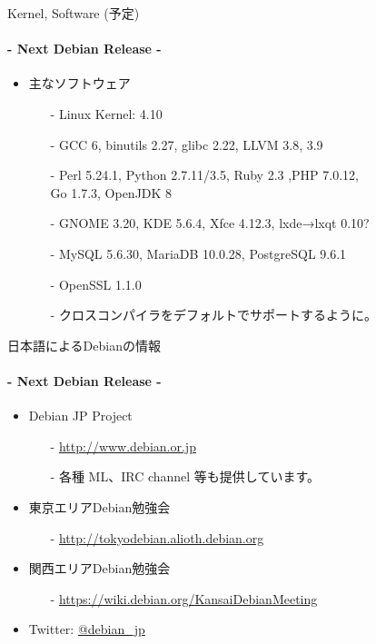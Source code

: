 \documentclass[cjk,dvipdfmx,14pt,compress,fragile]{beamer}
\begin{document}
\begin{frame}[c,fragile]{Kernel, Software (予定)}
  \framesubtitle{- Next Debian Release -}
  \pause
  \begin{itemize}[<+->]
    \item%
      主なソフトウェア
      \begin{itemize}[<+->]
      \item[-] %
        Linux Kernel: \alert{4.10}
      \item[-] %
        GCC 6, binutils 2.27, glibc 2.22, LLVM 3.8, 3.9
      \item[-] %
        Perl 5.24.1, Python 2.7.11/3.5, Ruby 2.3 ,PHP 7.0.12, \\Go 1.7.3, OpenJDK 8
      \item[-] %
        GNOME 3.20, KDE 5.6.4, Xfce 4.12.3, lxde→lxqt 0.10?
      \item[-] %
        MySQL 5.6.30, MariaDB 10.0.28, PostgreSQL 9.6.1
      \item[-] %
        OpenSSL 1.1.0
      \item[-] %
        クロスコンパイラをデフォルトでサポートするように。
      \end{itemize}
  \end{itemize}
\end{frame}

\begin{frame}[c,fragile]{日本語によるDebianの情報}
  \framesubtitle{- Next Debian Release -}
  \begin{itemize}
  \item Debian JP Project
    \begin{itemize}
    \item[-]
      \url{http://www.debian.or.jp}
    \item[-]
      各種 ML、IRC channel 等も提供しています。
    \end{itemize}
  \item 東京エリアDebian勉強会
    \begin{itemize}
    \item[-]
      \url{http://tokyodebian.alioth.debian.org}
    \end{itemize}
  \item 関西エリアDebian勉強会
    \begin{itemize}
    \item[-]
      \url{https://wiki.debian.org/KansaiDebianMeeting}
    \end{itemize}
  \item Twitter: \url{@debian_jp}
  \end{itemize}
\end{frame}


\takahashi[100]{　}
\end{document}
